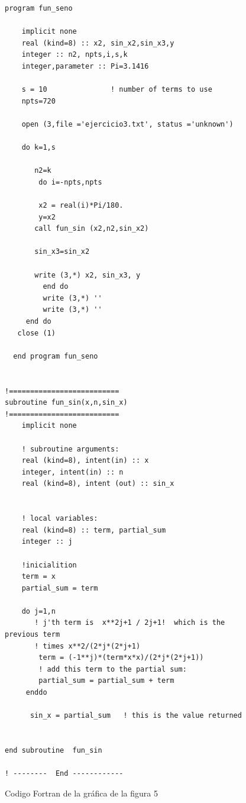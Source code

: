 \documentclass[12pt,a4paper,twoside]{article}
\begin{document}
\begin{figure}[h]
\begin{verbatim}
program fun_seno

    implicit none                  
    real (kind=8) :: x2, sin_x2,sin_x3,y
    integer :: n2, npts,i,s,k
    integer,parameter :: Pi=3.1416

    s = 10               ! number of terms to use
    npts=720
    
    open (3,file ='ejercicio3.txt', status ='unknown')

    do k=1,s     
       
       n2=k
        do i=-npts,npts
        
        x2 = real(i)*Pi/180.
        y=x2
       call fun_sin (x2,n2,sin_x2)

       sin_x3=sin_x2

       write (3,*) x2, sin_x3, y
         end do
         write (3,*) ''
         write (3,*) ''
     end do
   close (1)

  end program fun_seno

  
!==========================
subroutine fun_sin(x,n,sin_x)
!==========================
    implicit none

    ! subroutine arguments:
    real (kind=8), intent(in) :: x
    integer, intent(in) :: n
    real (kind=8), intent (out) :: sin_x
    

    ! local variables:
    real (kind=8) :: term, partial_sum
    integer :: j
    
    !inicialition 
    term = x
    partial_sum = term
    
    do j=1,n
       ! j'th term is  x**2j+1 / 2j+1!  which is the previous term
       ! times x**2/(2*j*(2*j+1)
        term = (-1**j)*(term*x*x)/(2*j*(2*j+1)) 
        ! add this term to the partial sum:
        partial_sum = partial_sum + term  
     enddo
     
      sin_x = partial_sum   ! this is the value returned

    
end subroutine  fun_sin

! --------  End ------------
\end{verbatim}
\caption{Codigo Fortran de la gráfica de la figura 5}
\label{fig:figura7}
\end{figure}
\end{document}
